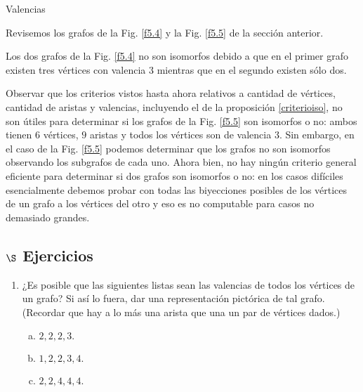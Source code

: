 \begin{section}{Valencias}
\begin{ejemplo} Revisemos los grafos de la Fig. \ref{f5.4} y la Fig. \ref{f5.5} de la sección anterior. 

Los dos grafos de la Fig. \ref{f5.4}  no son isomorfos debido a que en el primer grafo existen tres vértices con valencia $3$ mientras que en el segundo existen sólo dos.


Observar que los criterios vistos hasta ahora relativos a cantidad de vértices,  cantidad de aristas y valencias, incluyendo el de la proposición \ref{criterioiso}, no son útiles para determinar si los grafos de  la Fig. \ref{f5.5} son isomorfos o no: ambos tienen $6$ vértices, $9$ aristas y todos los vértices son de valencia $3$. Sin embargo, en el caso de la Fig. \ref{f5.5} podemos determinar que los grafos no son isomorfos observando los subgrafos de cada uno. Ahora bien, no  hay ningún criterio general eficiente para determinar si dos grafos son isomorfos o no: en los casos difíciles esencialmente debemos probar con todas las biyecciones posibles de los vértices de un grafo a los vértices del otro y eso es no computable para casos no demasiado  grandes.   
  
 
\end{ejemplo}

\subsection*{\Large $\S$ Ejercicios}\label{ejercicios5.3}
\begin{enumerate}[1)]
\item ¿Es posible que las siguientes listas sean las valencias de todos los vértices de un
grafo? Si así lo fuera, dar una representación pictórica de tal
grafo. (Recordar que hay a lo más una arista que una un par de
vértices dados.)
\begin{multicols}{2}
	\begin{enumerate}[a)]
		\item $2,2,2,3.$
		
		\item $1,2,2,3,4.$
		
		\item $2,2,4,4,4.$
		

\end{enumerate}
\end{multicols}
\end{enumerate}
\end{section}
